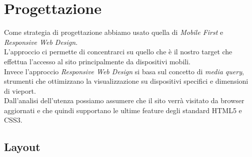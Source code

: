 \section{Progettazione}
Come strategia di progettazione abbiamo usato quella di \textit{Mobile First} e \textit{Responsive Web Design}.\\
L'approccio  ci permette di concentrarci su quello che è il nostro target che effettua l'accesso al sito principalmente da dispositivi mobili.\\
Invece l'approccio \textit{Responsive Web Design} si basa sul concetto di \textit{media query}, strumenti che ottimizzano la visualizzazione su dispositivi specifici e dimensioni di vieport.\\
Dall'analisi dell'utenza possiamo assumere che il sito verrà visitato da browser aggiornati e che quindi supportano le ultime feature degli standard HTML5 e CSS3.\\

\subsection{Layout}
